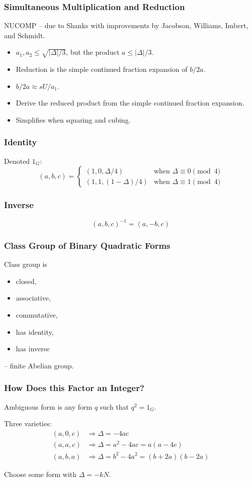 \documentclass{beamer}
\begin{document}
\begin{frame}
\frametitle{Simultaneous Multiplication and Reduction}
NUCOMP -- due to Shanks with improvements by Jacobson, Williams, Imbert, and Schmidt.
\begin{itemize}[<+->]
\item $a_1, a_2 \le \sqrt{|\Delta|/3}$, but the product $a \le |\Delta|/3$.
\item Reduction is the simple continued fraction expansion of $b/2a$.
\item $b/2a \approx sU/a_1$.
\item Derive the reduced product from the simple continued fraction expansion.
\item Simplifies when squaring and cubing.
\end{itemize}
\end{frame}

\begin{frame}
\frametitle{Identity}
Denoted $1_G$:
\[
(a, b, c) = \begin{cases}
  (1, 0, \Delta/4) & \textrm{when } \Delta \equiv 0 \pmod 4 \\
  (1, 1, (1-\Delta)/4) & \textrm{when } \Delta \equiv 1 \pmod 4
\end{cases}
\]
\end{frame}

\begin{frame}
\frametitle{Inverse}
\[
(a, b, c)^{-1} = (a, -b, c)
\]
\end{frame}

\begin{frame}
\frametitle{Class Group of Binary Quadratic Forms}
Class group is 
\begin{itemize}
\item closed,
\item associative,
\item commutative,
\item has identity,
\item has inverse
\end{itemize}
 -- finite Abelian group.
\end{frame}

\begin{frame}
\frametitle{How Does this Factor an Integer?}
Ambiguous form is any form $q$ such that $q^2 = 1_G$.

\bigbreak
Three varieties:
\begin{align*}
(a, 0, c) &\Rightarrow \Delta = -4ac \\
(a, a, c) &\Rightarrow \Delta = a^2 - 4ac = a(a - 4c) \\
(a, b, a) &\Rightarrow \Delta = b^2 - 4a^2 = (b+2a)(b-2a)
\end{align*}

Choose some form with $\Delta = -kN$.
\end{frame}
\end{document}

